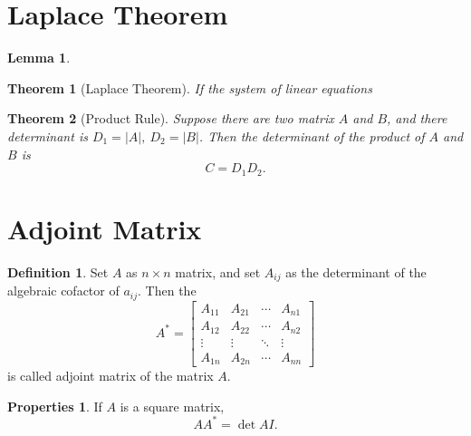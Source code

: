 \documentclass{article}
\newtheorem{theorem}{Theorem}[section]
\newtheorem{lemma}{Lemma}[theorem]
\theoremstyle{definition}
\newtheorem{defi}{Definition}[section]
\newtheorem{pro}{Properties}[section]
\begin{document}
\section{Laplace Theorem}
\begin{lemma}
\end{lemma}

\begin{theorem}[Laplace Theorem]
    If the system of linear equations
\end{theorem}


\begin{theorem}[Product Rule]
    Suppose there are two matrix $A$ and $B$,
    and there determinant is $D_{1}=|A|,\ D_{2}=|B|$.
    Then the determinant of the product of $A$ and $B$ is
    $$C=D_{1}D_{2}.$$
\end{theorem}


\section{Adjoint Matrix}
\begin{defi}
    Set $A$ as $n\times n$ matrix, and set $A_{ij}$ as the 
    determinant of the algebraic cofactor of $a_{ij}$. Then the 
    $$
    A^{*}
    =\begin{bmatrix}
        A_{11} & A_{21} & \cdots & A_{n1}\\
        A_{12} & A_{22} & \cdots & A_{n2}\\
        \vdots & \vdots & \ddots & \vdots\\
        A_{1n} & A_{2n} & \cdots & A_{nn}
    \end{bmatrix}
    $$
    is called adjoint matrix of the matrix $A$.
\end{defi}
\begin{pro}
    If $A$ is a square matrix, $$AA^{*}=\det{A}I.$$
\end{pro}
\end{document}
